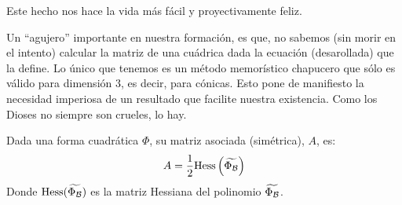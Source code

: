 Este hecho nos hace la vida más fácil y proyectivamente feliz.

Un ``agujero'' importante en nuestra formación, es que, no sabemos (sin morir en el intento) calcular la matriz de una cuádrica dada la ecuación (desarollada) que la define. Lo único que tenemos es un método memorístico chapucero que sólo es válido para dimensión $3$, es decir, para cónicas. Esto pone de manifiesto la necesidad imperiosa de un resultado que facilite nuestra existencia. Como los Dioses no siempre son crueles, lo hay.
\begin{prop}
	\label{C8_prop_Hessiana}
	Dada una forma cuadrática $\Phi$, su matriz asociada (simétrica), $A$, es: \[A=\frac{1}{2}\mathrm{Hess}\left(\widetilde{\Phi_{\mathcal{B}}}\right)\]
	Donde $\mathrm{Hess}(\widetilde{\Phi_{\mathcal{B}}})$ es la matriz Hessiana del polinomio $\widetilde{\Phi_{\mathcal{B}}}$.
\end{prop}
